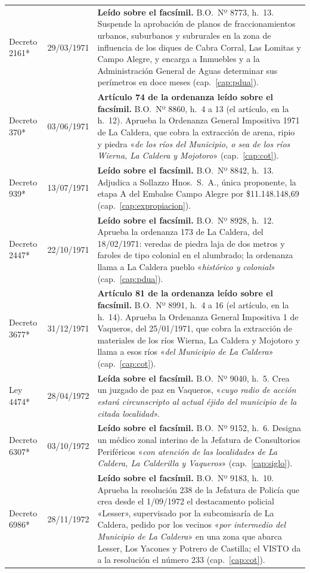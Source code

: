 \begin{longtable}{@{}p{3.2cm}p{1.9cm}p{7.9cm}@{}}
Decreto 2161* & 29/03/1971 & \textbf{Leído sobre el facsímil.} B.O.\ Nº 8773, h.\ 13. Suspende la aprobación de planos de fraccionamientos urbanos, suburbanos y subrurales en la zona de influencia de los diques de Cabra Corral, Las Lomitas y Campo Alegre, y encarga a Inmuebles y a la Administración General de Aguas determinar sus perímetros en doce meses (cap.\ \ref{cap:pdua}). \\
Decreto 370* & 03/06/1971 & \textbf{Artículo 74 de la ordenanza leído sobre el facsímil.} B.O.\ Nº 8860, h.\ 4 a 13 (el artículo, en la h.\ 12). Aprueba la Ordenanza General Impositiva 1971 de La Caldera, que cobra la extracción de arena, ripio y piedra «\textit{de los ríos del Municipio, o sea de los ríos Wierna, La Caldera y Mojotoro}» (cap.\ \ref{cap:cot}). \\
Decreto 939* & 13/07/1971 & \textbf{Leído sobre el facsímil.} B.O.\ Nº 8842, h.\ 13. Adjudica a Sollazzo Hnos.\ S.\ A., única proponente, la etapa A del Embalse Campo Alegre por \$11.148.148,69 (cap.\ \ref{cap:expropiacion}). \\
Decreto 2447* & 22/10/1971 & \textbf{Leído sobre el facsímil.} B.O.\ Nº 8928, h.\ 12. Aprueba la ordenanza 173 de La Caldera, del 18/02/1971: veredas de piedra laja de dos metros y faroles de tipo colonial en el alumbrado; la ordenanza llama a La Caldera pueblo «\textit{histórico y colonial}» (cap.\ \ref{cap:pdua}). \\
Decreto 3677* & 31/12/1971 & \textbf{Artículo 81 de la ordenanza leído sobre el facsímil.} B.O.\ Nº 8991, h.\ 4 a 16 (el artículo, en la h.\ 14). Aprueba la Ordenanza General Impositiva 1 de Vaqueros, del 25/01/1971, que cobra la extracción de materiales de los ríos Wierna, La Caldera y Mojotoro y llama a esos ríos «\textit{del Municipio de La Caldera}» (cap.\ \ref{cap:cot}). \\
Ley 4474* & 28/04/1972 & \textbf{Leída sobre el facsímil.} B.O.\ Nº 9040, h.\ 5. Crea un juzgado de paz en Vaqueros, «\textit{cuyo radio de acción estará circunscripto al actual éjido del municipio de la citada localidad}». \\
Decreto 6307* & 03/10/1972 & \textbf{Leído sobre el facsímil.} B.O.\ Nº 9152, h.\ 6. Designa un médico zonal interino de la Jefatura de Consultorios Periféricos «\textit{con atención de las localidades de La Caldera, La Calderilla y Vaqueros}» (cap.\ \ref{cap:siglo}). \\
Decreto 6986* & 28/11/1972 & \textbf{Leído sobre el facsímil.} B.O.\ Nº 9183, h.\ 10. Aprueba la resolución 238 de la Jefatura de Policía que crea desde el 1/09/1972 el destacamento policial «Lesser», supervisado por la subcomisaría de La Caldera, pedido por los vecinos «\textit{por intermedio del Municipio de La Caldera}» en una zona que abarca Lesser, Los Yacones y Potrero de Castilla; el VISTO da a la resolución el número 233 (cap.\ \ref{cap:cot}). \\

\end{longtable}
